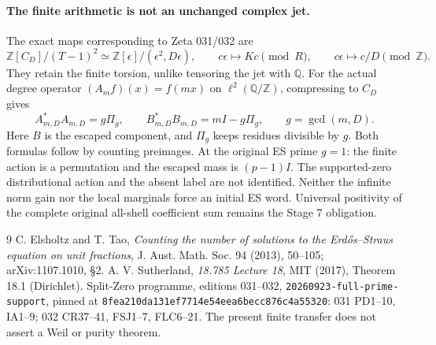 \documentclass[10pt]{article}
\begin{document}
\paragraph{The finite arithmetic is not an unchanged complex jet.}
The exact maps corresponding to Zeta 031/032 are
\[
 \mathbb Z[C_D]/(T-1)^2\simeq\mathbb Z[\epsilon]/(\epsilon^2,D\epsilon),
 \qquad c\epsilon\mapsto Kc\pmod R,
 \qquad c\epsilon\mapsto c/D\pmod{\mathbb Z}.
\]
They retain the finite torsion, unlike tensoring the jet with $\mathbb Q$.
For the actual degree operator $(A_mf)(x)=f(mx)$ on $\ell^2(\mathbb Q/\mathbb Z)$,
compressing to $C_D$ gives
\[
 A_{m,D}^*A_{m,D}=g\Pi_g,\qquad
 B_{m,D}^*B_{m,D}=mI-g\Pi_g,\qquad g=\gcd(m,D).
\]
Here $B$ is the escaped component, and $\Pi_g$ keeps residues divisible by
$g$. Both formulas follow by counting preimages. At the original ES prime
$g=1$: the finite action is a permutation and the escaped mass is $(p-1)I$.
The supported-zero distributional action and the absent label are not
identified. Neither the infinite norm gain nor the local marginals force
an initial ES word. Universal positivity of the complete original
all-shell coefficient sum remains the Stage 7 obligation.

\begin{thebibliography}{9}\small
{} C. Elsholtz and T. Tao, \emph{Counting the number of solutions
to the Erd\H{o}s--Straus equation on unit fractions}, J. Aust. Math. Soc.
94 (2013), 50--105; arXiv:1107.1010, \S2.
 A. V. Sutherland, \emph{18.785 Lecture 18}, MIT (2017),
Theorem 18.1 (Dirichlet).
 Split-Zero programme, editions 031--032,
\texttt{20260923-full-prime-support}, pinned at
\texttt{8fea210da131ef7714e54eea6becc876c4a55320}:
031 PD1--10, IA1--9; 032 CR37--41, FSJ1--7, FLC6--21.
The present finite transfer does not assert a Weil or purity theorem.
\end{thebibliography}
\end{document}
